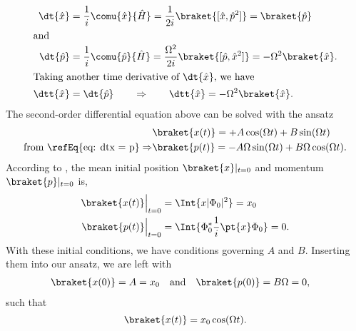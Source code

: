 \begin{align}
	\dt{\hat{x}} &= {1 \over i} \comu{\hat{x}}{\hat{H}} = {1\over 2i} \braket{[\hat{x},\hat{p}^2]} = \braket{\hat{p}} \label{eq: dtx = p}\\
	\intertext{and}
	\dt{\hat{p}} &= {1 \over i} \comu{\hat{p}}{\hat{H}} = {\Omega ^2\over 2i} \braket{[\hat{p},\hat{x}^2]} = - \Omega ^2\braket{\hat{x}}. \\
	\intertext{Taking another time derivative of $\dt{\hat{x}}$, we have} 
	\dtt{\hat{x}}&= \dt{\hat{p}} \qquad \Rightarrow \qquad \dtt{\hat{x}} = - \Omega ^2\braket{\hat{x}}.
\end{align}
The second-order differential equation above can be solved with the ansatz
\begin{align*}
	&\braket{x(t)} = +A\cos(\Omega t) + B\sin(\Omega t)\\
		\text{from \refEq{eq: dtx = p}}\Rightarrow &\braket{p(t)} = -A\Omega\sin(\Omega t) + B\Omega\cos(\Omega t).
\end{align*}
According to , the mean initial position $\braket{x}|_{t=0}$ and momentum $\braket{p}|_{t=0}$ is, 
\begin{align*}
	\braket{x(t)}\Big|_{t=0} & = \Int{x|\Phi _0|^2} = x_0\\
	\braket{p(t)}\Big|_{t=0} & = \Int{\Phi _0^* {1\over i }\pt{x}\Phi _0 } = 0.
\end{align*}
With these initial conditions, we have conditions governing $A$ and $B$.
Inserting them into our ansatz, we are left with
\begin{align*}
	&\braket{x(0)} = A = x_0 \quad \text{and} \quad \braket{p(0)} =  B\Omega= 0,
\end{align*}
such that
\begin{equation}
	\braket{x(t)} = x_0 \cos(\Omega t).
	\label{eq: x sol}
\end{equation}


